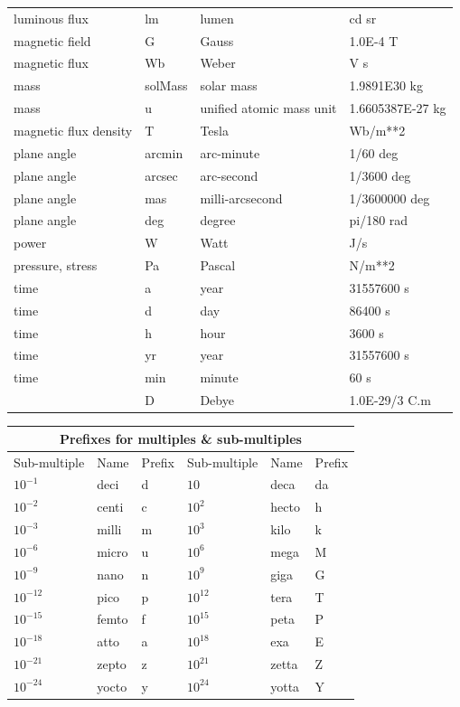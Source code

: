 \documentclass[twoside,11pt]{article}
\begin{document}
\begin{center}
\begin{tabular}{|l|l|l|l|}
luminous flux & lm & lumen & cd sr \\
magnetic field & G & Gauss & 1.0E-4 T \\
magnetic flux & Wb & Weber & V s \\
mass & solMass & solar mass & 1.9891E30 kg \\
mass & u & unified atomic mass unit & 1.6605387E-27 kg \\
magnetic flux density & T & Tesla & Wb/m**2 \\
plane angle  & arcmin & arc-minute & 1/60 deg \\
plane angle  & arcsec & arc-second & 1/3600 deg \\
plane angle  & mas & milli-arcsecond & 1/3600000 deg \\
plane angle & deg & degree & pi/180 rad \\
power & W & Watt & J/s \\
pressure, stress & Pa & Pascal & N/m**2 \\
time  & a & year & 31557600 s \\
time  & d & day & 86400 s \\
time  & h & hour & 3600 s \\
time  & yr & year & 31557600 s \\
time  & min & minute & 60 s \\
      & D & Debye & 1.0E-29/3 C.m \\
\hline
\end{tabular}
\end{center}

\begin{center}
\begin{tabular}{|lll|lll|}
\hline
\multicolumn{6}{|c|}{{\large Prefixes for multiples \& 
sub-multiples}} \\ \hline
\multicolumn{1}{|c}{Sub-multiple} & \multicolumn{1}{c}{Name} & 
\multicolumn{1}{c|}{Prefix} &
\multicolumn{1}{|c}{Sub-multiple} & \multicolumn{1}{c}{Name} & 
\multicolumn{1}{c|}{Prefix} \\ \hline
$10^{-1}$ & deci & d & $10$ & deca & da \\
$10^{-2}$ & centi & c & $10^{2}$ & hecto & h \\
$10^{-3}$ & milli & m & $10^{3}$ & kilo & k \\
$10^{-6}$ & micro & u & $10^{6}$ & mega & M \\
$10^{-9}$ & nano & n & $10^{9}$ & giga & G \\
$10^{-12}$ & pico & p & $10^{12}$ & tera & T \\
$10^{-15}$ & femto & f & $10^{15}$ & peta & P \\
$10^{-18}$ & atto & a & $10^{18}$ & exa & E \\
$10^{-21}$ & zepto & z & $10^{21}$ & zetta & Z \\
$10^{-24}$ & yocto & y & $10^{24}$ & yotta & Y \\
\hline
\end{tabular}
\end{center}
\end{document}
